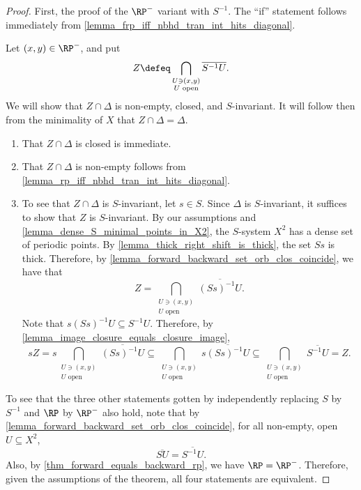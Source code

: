 \begin{proof}
    First, the proof of the $\RP^-$ variant with $S^{-1}$.  The ``if'' statement follows immediately from \cref{lemma_frp_iff_nbhd_tran_int_hits_diagonal}.

    
    Let $(x,y) \in \RP^-$, and put
    \[Z \defeq \bigcap_{\substack{U \ni (x,y) \\ U \text{ open}}} \overline{S^{-1} U}.\]
    We will show that $Z \cap \Delta$ is non-empty, closed, and $S$-invariant.  It will follow then from the minimality of $X$ that $Z \cap \Delta = \Delta$.

    \begin{enumerate}
        \item That $Z \cap \Delta$ is closed is immediate.

        \item That $Z \cap \Delta$ is non-empty follows from \cref{lemma_rp_iff_nbhd_tran_int_hits_diagonal}.

        \item To see that $Z \cap \Delta$ is $S$-invariant, let $s \in S$.  Since $\Delta$ is $S$-invariant, it suffices to show that $Z$ is $S$-invariant.  By our assumptions and \cref{lemma_dense_S_minimal_points_in_X2}, the $S$-system $X^2$ has a dense set of periodic points.  By \cref{lemma_thick_right_shift_is_thick}, the set $Ss$ is thick. Therefore, by \cref{lemma_forward_backward_set_orb_clos_coincide}, we have that
        \[Z = \bigcap_{\substack{U \ni (x,y) \\ U \text{ open}}} \overline{(Ss)^{-1} U}.\]
        Note that $s(Ss)^{-1} U \subseteq S^{-1} U$.
        Therefore, by \cref{lemma_image_closure_equals_closure_image},
        \[
            sZ = s\bigcap_{\substack{U \ni (x,y) \\ U \text{ open}}} \overline{(Ss)^{-1} U} \subseteq \bigcap_{\substack{U \ni (x,y) \\ U \text{ open}}} s \overline{(Ss)^{-1} U} \subseteq \bigcap_{\substack{U \ni (x,y) \\ U \text{ open}}} \overline{S^{-1} U} = Z.
        \]
    \end{enumerate}

    To see that the three other statements gotten by independently replacing $S$ by $S^{-1}$ and $\RP$ by $\RP^-$ also hold, note that by \cref{lemma_forward_backward_set_orb_clos_coincide}, for all non-empty, open $U \subseteq X^2$,
    \[\overline{S U} = \overline{S^{-1}U}.\]
    Also, by \cref{thm_forward_equals_backward_rp}, we have $\RP = \RP^-$.  Therefore, given the assumptions of the theorem, all four statements are equivalent.
\end{proof}

